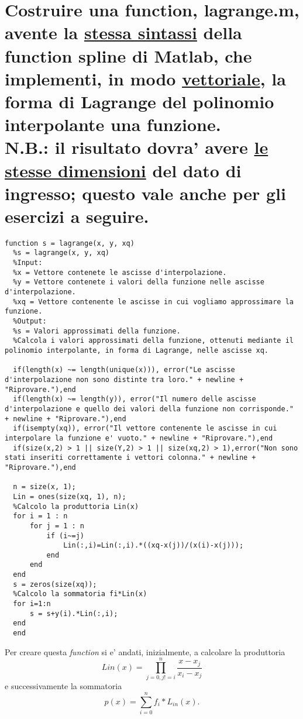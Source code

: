 \documentclass[10pt,a4paper]{article}
\begin{document}
\section{
  Costruire una function, \textbf{lagrange.m}, avente la \underline{stessa sintassi} della function spline
  di Matlab, che implementi, in modo \underline{vettoriale}, la forma di Lagrange del polinomio interpolante una
  funzione.
  \\
  \textbf{N.B.:} il risultato dovra' avere \underline{le stesse dimensioni} del dato di ingresso; questo vale anche per gli
  esercizi a seguire.
 }

\begin{lstlisting}[style=Matlab-editor]
  function s = lagrange(x, y, xq)
  %s = lagrange(x, y, xq)
  %Input:
  %x = Vettore contenete le ascisse d'interpolazione.
  %y = Vettore contenete i valori della funzione nelle ascisse d'interpolazione.
  %xq = Vettore contenente le ascisse in cui vogliamo approssimare la funzione.
  %Output:
  %s = Valori approssimati della funzione.
  %Calcola i valori approssimati della funzione, ottenuti mediante il polinomio interpolante, in forma di Lagrange, nelle ascisse xq.
  
  if(length(x) ~= length(unique(x))), error("Le ascisse d'interpolazione non sono distinte tra loro." + newline + "Riprovare."),end 
  if(length(x) ~= length(y)), error("Il numero delle ascisse d'interpolazione e quello dei valori della funzione non corrisponde." + newline + "Riprovare."),end
  if(isempty(xq)), error("Il vettore contenente le ascisse in cui interpolare la funzione e' vuoto." + newline + "Riprovare."),end
  if(size(x,2) > 1 || size(Y,2) > 1 || size(xq,2) > 1),error("Non sono stati inseriti correttamente i vettori colonna." + newline + "Riprovare."),end
   
  n = size(x, 1);
  Lin = ones(size(xq, 1), n);
  %Calcolo la produttoria Lin(x)
  for i = 1 : n
      for j = 1 : n
          if (i~=j)
              Lin(:,i)=Lin(:,i).*((xq-x(j))/(x(i)-x(j)));
          end
      end
  end
  s = zeros(size(xq));
  %Calcolo la sommatoria fi*Lin(x)
  for i=1:n
      s = s+y(i).*Lin(:,i);
  end
  end
\end{lstlisting}

Per creare questa \textit{function} si e' andati, inizialmente, a calcolare la 
produttoria \[ Lin(x) = \prod_{j = 0, j != i}^{n} \frac{x - x_j}{x_i - x_j} \]
e successivamente la sommatoria \[ p(x) = \sum_{i = 0}^{n} f_i * L_{in}(x). \]
\end{document}
